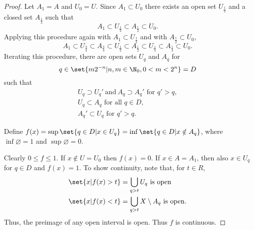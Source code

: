 \documentclass{article}
\renewcommand{\emptyset}{\varnothing}
\begin{document}
\begin{proof}
    Let $A_1 = A$ and $U_0 = U$. Since $A_1 \subset U_0$ there exists an open set $U_\frac{1}{2}$ and a closed set $A_\frac{1}{2}$ such that
    \begin{equation*}
        A_1 \subset U_\frac{1}{2} \subset A_\frac{1}{2} \subset U_0.
    \end{equation*}
    Applying this procedure again with $A_1 \subset U_\frac{1}{2}$ and with $A_\frac{1}{2} \subset U_0$,
    \begin{equation*}
        A_1 \subset U_\frac{3}{4} \subset A_\frac{3}{4} \subset U_\frac{1}{2} \subset A_\frac{1}{2} \subset U_\frac{1}{4} \subset A_\frac{1}{4} \subset U_0.
    \end{equation*}
    Iterating this procedure, there are open sets $U_q$ and $A_q$ for
    \begin{equation*}
        q \in \set{m 2^{-n} | n, m \in \N_0, 0 < m < 2^n} = D
    \end{equation*}
    such that
    \begin{gather*}
        U_q \supset U_q' \ \text{and} \ A_q \supset A_q' \text{ for } q' > q, \\
        U_q \subset A_q \text{ for all } q \in D, \\
        A_q' \subset U_q \text{ for } q' > q.
    \end{gather*}

    Define $f(x) = \sup\set{q \in D | x \in U_q} = \inf\set{q \in D | x \notin A_q}$, where $\inf \emptyset = 1$ and $\sup \emptyset = 0$.

    Clearly $0 \leq f \leq 1$. If $x \notin U = U_0$ then $f(x) = 0$. If $x \in A = A_1$, then also $x \in U_q$ for $q \in D$ and $f(x) = 1$.
    To show continuity, note that, for $t \in R$,
    \begin{align*}
        \set{x | f(x) > t} &= \bigcup_{q > t} U_q \text{ is open} \\
        \set{x | f(x) < t} &= \bigcup_{q > t} X \setminus A_q \text{ is open}.
    \end{align*}
    Thus, the preimage of any open interval is open. Thus $f$ is continuous.
\end{proof}

\end{document}
